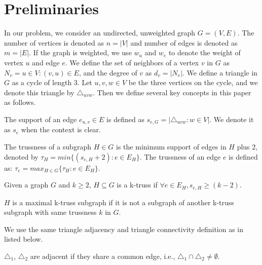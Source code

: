 \section{Preliminaries}
\label{preliminary}

In our problem, we consider an undirected, unweighted graph $G = (V,E)$. The number of vertices is denoted as $n = |V|$ and number of edges is denoted as $m = |E|$. If the graph is weighted, we use $w_u$ and $w_e$ to denote the weight of vertex $u$ and edge $e$. We define the set of neighbors of a vertex $v$ in $G$ as $N_v = {u \in V :(v, u) \in E}$, and the degree of $v$ as $d_v = |N_v|$. We define a triangle in $G$ as a cycle of length 3. Let $u, v, w \in V$ be the three vertices on the cycle, and we denote this triangle by $\triangle_{uvw}$. Then we define several key concepts in this paper as follows.

\begin{Def}
The support of an edge $e_{u,v} \in E$ is defined as $s_{e,G} = |{\triangle_{uvw} : w \in V}|$. We denote it as $s_e$ when the context is clear.
\label{def:edge_support}
\end{Def}

\begin{Def}[Trussness] 
The trussness of a subgraph $H \in G$ is the minimum support of edges in $H$ plus $2$, denoted by $\tau_{H} = min\{(s_{e,H} + 2): e \in E_{H}\} $.  The trussness of an edge $e$ is defined as: $\tau_{e} = max_{H \in G}\{\tau_{H}: e \in E_{H}\}$.
\label{def:trussness}
\end{Def}

\begin{Def}
Given a graph $G$ and $k \ge 2$, $H \subseteq G$ is a k-truss if $\forall e \in E_{H}, s_{e,H} \ge (k - 2)$. 
\label{def:k-truss}
\end{Def}

\begin{Def}
$H$ is a maximal k-truss subgraph if it is not a subgraph of another k-truss subgraph with same trussness $k$ in $G$.
\label{def:maximal_k-truss}
\end{Def}

We use the same triangle adjacency and triangle connectivity definition as in~\cite{huang2014querying} listed below.

\begin{Def}
${\triangle}_{1}$, ${\triangle}_{2}$ are adjacent if they share a common edge, i.e., ${\triangle}_{1} \cap {\triangle}_{2} \neq \emptyset$. 
\label{def:triangle_adjacency}
\end{Def}

